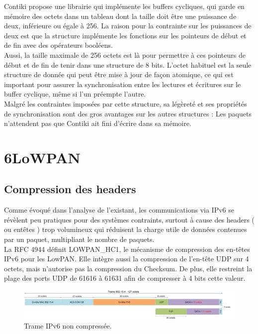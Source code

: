 				Contiki propose une librairie qui implémente les buffers cycliques, qui garde en mémoire des octets dans un tableau dont la taille doit être une puissance de deux, inférieure ou égale à 256. La raison pour la contrainte sur les puissances de deux est que la structure implémente les fonctions sur les pointeurs de début et de fin avec des opérateurs booléens.\\
				Aussi, la taille maximale de 256 octets est là pour permettre à ces pointeurs de début et de fin de tenir dans une structure de 8 bits. L'octet habituel est la seule structure de donnée qui peut être mise à jour de façon atomique, ce qui est important pour assurer la synchronisation entre les lectures et écritures sur le buffer cyclique, même si l'un préempte l'autre.\\
				
				Malgré les contraintes imposées par cette structure, sa légèreté et ses propriétés de synchronisation sont des gros avantages sur les autres structures : Les paquets n'attendent pas que Contiki ait fini d'écrire dans sa mémoire.
	
\section{6LoWPAN}
	\subsection{Compression des headers}
		Comme évoqué dans l'analyse de l'existant, les communications via IPv6 se révèlent peu pratiques pour des systèmes contraints, surtout à cause des headers ( ou entêtes ) trop volumineux qui réduisent la charge utile de données contenues par un paquet, multipliant le nombre de paquets. \\
		La RFC 4944 définit LOWPAN\_HC1, le mécanisme de compression des en-têtes IPv6 pour les LowPAN. Elle intègre aussi la compression de l'en-tête UDP sur 4 octets, mais n'autorise pas la compression du Checksum. De plus, elle restreint la plage des ports UDP de 61616 à 61631 afin de compresser à 4 bits cette valeur.
		
		\begin{figure}[htp]
			\centering
			\includegraphics[width=16cm]{images/TramePasComp.jpg}
			\caption{Trame IPv6 non compressée.}
			\label{fig:tramepascomp}
		\end{figure}
		
